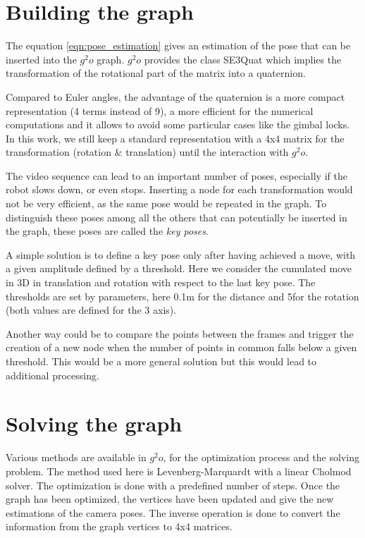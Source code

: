 \section{Building the graph}

The equation \ref{eqn:pose_estimation} gives an estimation of the pose that can be inserted into the $g^2o$ graph.
$g^2o$ provides the class SE3Quat which implies the transformation of the rotational part of the matrix into a quaternion.

Compared to Euler angles, the advantage of the quaternion is a more compact representation (4 terms instead of 9), a more efficient for the numerical computations and it allows to avoid some particular cases like the gimbal locks. In this work, we still keep a standard representation with a 4x4 matrix for the transformation (rotation \& translation) until the interaction with $g^2o$.

The video sequence can lead to an important number of poses, especially if the robot slows down, or even stops. Inserting a node for each transformation would not be very efficient, as the same pose would be repeated in the graph. To distinguish these poses among all the others that can potentially be inserted in the graph, these poses are called the \emph{key poses}. 

A simple solution is to define a key pose only after having achieved a move, with a given amplitude defined by a threshold. Here we consider the cumulated move in 3D in translation and rotation with respect to the last key pose. The thresholds are set by parameters, here 0.1m for the distance and 5\textdegree for the rotation (both values are defined for the 3 axis).

Another way could be to compare the points between the frames and trigger the creation of a new node when the number of points in common falls below a given threshold. This would be a more general solution but this would lead to additional processing.

\section{Solving the graph}

Various methods are available in $g^2o$, for the optimization process and the solving problem. The method used here is Levenberg-Marquardt with a linear Cholmod solver. The optimization is done with a predefined number of steps. Once the graph has been optimized, the vertices have been updated and give the new estimations of the camera poses. The inverse operation is done to convert the information from the graph vertices to 4x4 matrices.

